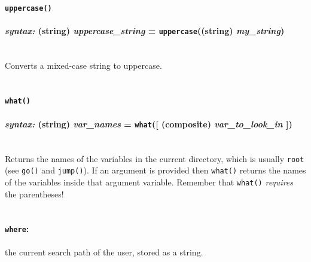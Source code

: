 \documentclass{article}
\begin{document}
 





\paragraph{\texttt{uppercase()}\\\\
\normalfont \emph{syntax: } (string) \emph{uppercase\_string} = \texttt{uppercase}((string) \emph{my\_string})\\\\}

Converts a mixed-case string to uppercase.\\\\




\paragraph{\texttt{what()}\\\\
\normalfont \emph{syntax: } (string) \emph{var\_names} = \texttt{what}([ (composite) \emph{var\_to\_look\_in} ])\\\\}

Returns the names of the variables in the current directory, which is usually \verb#root# (see \verb#go()# and \verb#jump()#).  If an argument is provided then \verb#what()# returns the names of the variables inside that argument variable.  Remember that \verb#what()# \emph{requires} the parentheses!\\\\





\paragraph{\texttt{where}:}  the current search path of the user, stored as a string.\\\\




\end{document}
